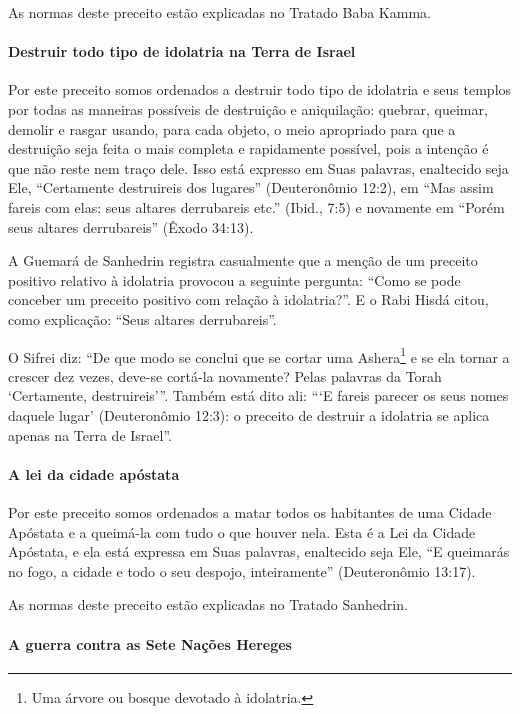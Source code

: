 As normas deste preceito estão explicadas no Tratado Baba Kamma.

\paragraph{Destruir todo tipo de idolatria na Terra de Israel}

Por este preceito somos ordenados a destruir todo tipo de idolatria e
seus templos por todas as maneiras possíveis de destruição e
aniquilação: quebrar, queimar, demolir e rasgar usando, para cada
objeto, o meio apropriado para que a destruição seja feita o mais
completa e rapidamente possível, pois a intenção é que não reste nem
traço dele. Isso está expresso em Suas palavras, enaltecido seja Ele,
``Certamente destruireis dos lugares'' (Deuteronômio 12:2), em ``Mas
assim fareis com elas: seus altares derrubareis etc.'' (Ibid., 7:5) e
novamente em ``Porém seus altares derrubareis'' (Êxodo 34:13).

A Guemará de Sanhedrin registra casualmente que a menção de um preceito
positivo relativo à idolatria provocou a seguinte pergunta: ``Como se
pode conceber um preceito positivo com relação à idolatria?''. E o Rabi
Hisdá citou, como explicação: ``Seus altares derrubareis''.

O Sifrei diz: ``De que modo se conclui que se cortar uma
Ashera\footnote{Uma árvore ou bosque devotado à idolatria.}
e se ela tornar a crescer dez vezes, deve-se cortá-la novamente? Pelas
palavras da Torah `Certamente, destruireis'''. Também está dito ali:
```E fareis parecer os seus nomes daquele lugar' (Deuteronômio 12:3): o
preceito de destruir a idolatria se aplica apenas na Terra de Israel''.

\paragraph{A lei da cidade apóstata}

Por este preceito somos ordenados a matar todos os habitantes de uma
Cidade Apóstata e a queimá-la com tudo o que houver nela. Esta é a Lei
da Cidade Apóstata, e ela está expressa em Suas palavras, enaltecido
seja Ele, ``E queimarás no fogo, a cidade e todo o seu despojo,
inteiramente'' (Deuteronômio 13:17).

As normas deste preceito estão explicadas no Tratado Sanhedrin.

\paragraph{A guerra contra as Sete Nações Hereges}

